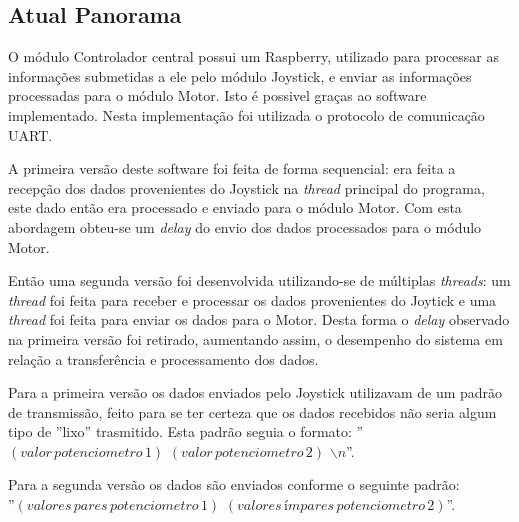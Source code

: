 \subsection{Atual Panorama}

  O módulo Controlador central possui um Raspberry, utilizado para processar as informações submetidas a ele pelo módulo Joystick, e enviar as informações processadas para o módulo Motor. Isto é possivel graças ao software implementado. Nesta implementação foi utilizada o protocolo de comunicação UART.

  A primeira versão deste software foi feita de forma sequencial: era feita a recepção dos dados provenientes do Joystick na \textit{thread} principal do programa, este dado então era processado e enviado para o módulo Motor. Com esta abordagem obteu-se um \textit{delay} do envio dos dados processados para o módulo Motor.

  Então uma segunda versão foi desenvolvida utilizando-se de múltiplas \textit{threads}: um \textit{thread} foi feita para receber e processar os dados provenientes do Joytick e uma \textit{thread} foi feita para enviar os dados para o Motor. Desta forma o \textit{delay} observado na primeira versão foi retirado, aumentando assim, o desempenho do sistema em relação a transferência e processamento dos dados.

  Para a primeira versão os dados enviados pelo Joystick utilizavam de um padrão de transmissão, feito para se ter certeza que os dados recebidos não seria algum tipo de ''lixo'' trasmitido. Esta padrão seguia o formato: ''$(valor\, potenciometro\, 1)$ $(valor\, potenciometro\, 2)$ $\backslash n$''.

  Para a segunda versão os dados são enviados conforme o seguinte padrão:\\ ''$(valores\, pares\, potenciometro\, 1)$ $(valores\, ímpares\, potenciometro\, 2)$''.


